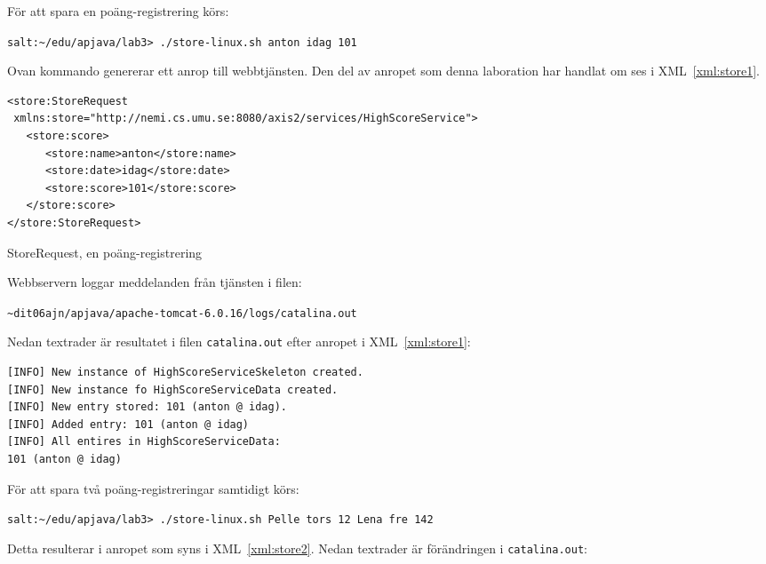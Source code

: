 \documentclass[a4paper, 12pt]{article}
\begin{document}
För att spara en poäng-registrering körs:

\begin{footnotesize}
\verb!salt:~/edu/apjava/lab3> ./store-linux.sh anton idag 101!
\end{footnotesize}

Ovan kommando genererar ett anrop till webbtjänsten. Den del av
anropet som denna laboration har handlat om ses i
XML~\ref{xml:store1}.

\begin{xml}
  \begin{footnotesize}
\begin{verbatim}
<store:StoreRequest
 xmlns:store="http://nemi.cs.umu.se:8080/axis2/services/HighScoreService">
   <store:score>
      <store:name>anton</store:name>
      <store:date>idag</store:date>
      <store:score>101</store:score>
   </store:score>
</store:StoreRequest>
\end{verbatim}
  \end{footnotesize}
  \caption{StoreRequest, en poäng-registrering}\label{xml:store1}
\end{xml}

Webbservern loggar meddelanden från tjänsten i filen:

\begin{footnotesize}
\verb!~dit06ajn/apjava/apache-tomcat-6.0.16/logs/catalina.out!
\end{footnotesize}

Nedan textrader är resultatet i filen \verb!catalina.out! efter
anropet i XML~\ref{xml:store1}:

\begin{footnotesize}
\begin{verbatim}
[INFO] New instance of HighScoreServiceSkeleton created.
[INFO] New instance fo HighScoreServiceData created.
[INFO] New entry stored: 101 (anton @ idag).
[INFO] Added entry: 101 (anton @ idag)
[INFO] All entires in HighScoreServiceData:
101 (anton @ idag)
\end{verbatim}
\end{footnotesize}

För att spara två poäng-registreringar samtidigt körs: 

\begin{footnotesize}
\verb!salt:~/edu/apjava/lab3> ./store-linux.sh Pelle tors 12 Lena fre 142!
\end{footnotesize}

Detta resulterar i anropet som syns i XML~\ref{xml:store2}. Nedan
textrader är förändringen i \verb!catalina.out!:
\end{document}
